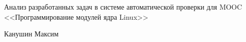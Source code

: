 \documentclass[a4paper,12pt]{article}
\begin{document}
\begin{center}
	\large Анализ разработанных задач в системе автоматической проверки для MOOC <<Программирование модулей ядра Linux>>
	
	\normalsize Канушин Максим
\end{center}





\end{document}
